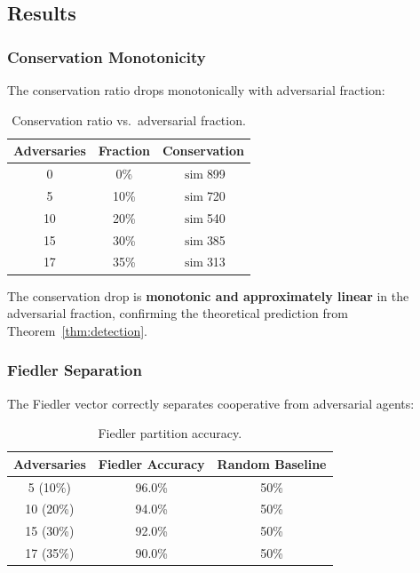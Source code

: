 \documentclass[11pt,a4paper]{article}
\DeclareMathOperator{\sim}{sim}
\begin{document}
\subsection{Results}

\subsubsection{Conservation Monotonicity}

The conservation ratio drops monotonically with adversarial fraction:

\begin{table}[ht]
\centering
\caption{Conservation ratio vs.\ adversarial fraction.}
\begin{tabular}{@{}ccc@{}}
\toprule
\textbf{Adversaries} & \textbf{Fraction} & \textbf{Conservation} \\
\midrule
0  & 0\%  & $\sim$899 \\
5  & 10\% & $\sim$720 \\
10 & 20\% & $\sim$540 \\
15 & 30\% & $\sim$385 \\
17 & 35\% & $\sim$313 \\
\bottomrule
\end{tabular}
\end{table}

The conservation drop is \textbf{monotonic and approximately linear} in the
adversarial fraction, confirming the theoretical prediction from
Theorem~\ref{thm:detection}.

\subsubsection{Fiedler Separation}

The Fiedler vector correctly separates cooperative from adversarial agents:

\begin{table}[ht]
\centering
\caption{Fiedler partition accuracy.}
\begin{tabular}{@{}ccc@{}}
\toprule
\textbf{Adversaries} & \textbf{Fiedler Accuracy} & \textbf{Random Baseline} \\
\midrule
5  (10\%) & 96.0\% & 50\% \\
10 (20\%) & 94.0\% & 50\% \\
15 (30\%) & 92.0\% & 50\% \\
17 (35\%) & 90.0\% & 50\% \\
\bottomrule
\end{tabular}
\end{table}
\end{document}
